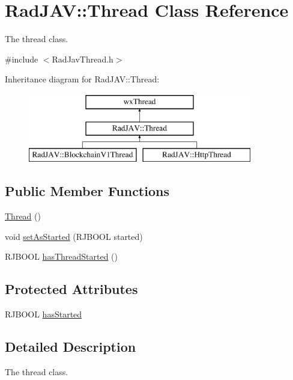 \hypertarget{class_rad_j_a_v_1_1_thread}{}\section{Rad\+J\+AV\+:\+:Thread Class Reference}
\label{class_rad_j_a_v_1_1_thread}


The thread class.  




{\ttfamily \#include $<$Rad\+Jav\+Thread.\+h$>$}

Inheritance diagram for Rad\+J\+AV\+:\+:Thread\+:\begin{figure}[H]
\begin{center}
\leavevmode
\includegraphics[height=3.000000cm]{class_rad_j_a_v_1_1_thread}
\end{center}
\end{figure}
\subsection*{Public Member Functions}
\begin{DoxyCompactItemize}
\item 
\mbox{\hyperlink{class_rad_j_a_v_1_1_thread_adbea1e24babbf8200368a6e2ba7977c8}{Thread}} ()
\item 
void \mbox{\hyperlink{class_rad_j_a_v_1_1_thread_a18b3337d52fc32856aa0822ed95c0f5a}{set\+As\+Started}} (R\+J\+B\+O\+OL started)
\item 
R\+J\+B\+O\+OL \mbox{\hyperlink{class_rad_j_a_v_1_1_thread_aa66258ff24f845f5232eef6e54bfbc34}{has\+Thread\+Started}} ()
\end{DoxyCompactItemize}
\subsection*{Protected Attributes}
\begin{DoxyCompactItemize}
\item 
R\+J\+B\+O\+OL \mbox{\hyperlink{class_rad_j_a_v_1_1_thread_a223e908c756b4ab2ed2b5d097e6764f3}{has\+Started}}
\end{DoxyCompactItemize}


\subsection{Detailed Description}
The thread class. 

